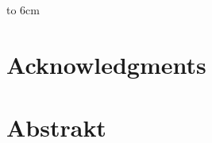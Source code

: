 % 
% 


\ifx\draft\undefined
\chapter*{}

{~}\vspace{10cm}

\begin{minipage}{0.25\textwidth}~\end{minipage}
\begin{minipage}{0.69\textwidth}
\mfdeclaration

\bigskip\bigskip

\hfill\hbox to 6cm{\dotfill}
\end{minipage}
\vfill %
\fi


\ifx\draft\undefined
\chapter*{Acknowledgments}

\mfacknowledgments
\fi


\ifx\draft\undefined

 \chapter*{Abstrakt}
%
%

